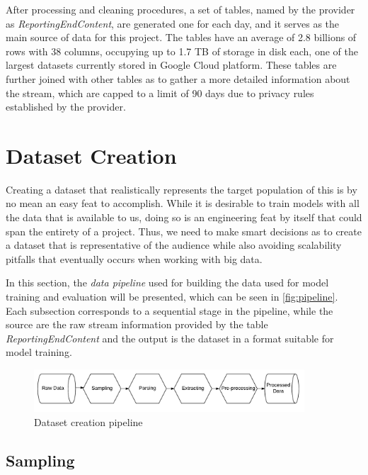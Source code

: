 \documentclass{kththesis}
\begin{document}
After processing and cleaning procedures, a set of tables, named by the provider as \emph{ReportingEndContent}, are generated one for each day, and it serves as the main source of data for this project. The tables have an average of 2.8 billions of rows with 38 columns, occupying up to 1.7 TB of storage in disk each, one of the largest datasets currently stored in Google Cloud platform. These tables are further joined with other tables as to gather a more detailed information about the stream, which are capped to a limit of 90 days due to privacy rules established by the provider.

\section{Dataset Creation}

Creating a dataset that realistically represents the target population of this is by no mean an easy feat to accomplish. While it is desirable to train models with all the data that is available to us, doing so is an engineering feat by itself that could span the entirety of a project. Thus, we need to make smart decisions as to create a dataset that is representative of the audience while also avoiding scalability pitfalls that eventually occurs when working with big data.

In this section, the \emph{data pipeline} used for building the data used for model training and evaluation will be presented, which can be seen in \autoref{fig:pipeline}. Each subsection corresponds to a sequential stage in the pipeline, while the source are the raw stream information provided by the table \emph{ReportingEndContent} and the output is the dataset in a format suitable for model training.

	\begin{figure}[h]
    \centering
    \includegraphics[width=0.9\textwidth,keepaspectratio]{figures/pipeline.pdf}
    \caption{Dataset creation pipeline}
    \label{fig:pipeline}
	\end{figure}

\subsection{Sampling}
\label{sec:sampling}
\end{document}

